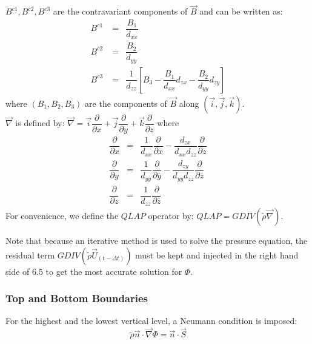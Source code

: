 $B^{c1}, B^{c2}, B^{c3}$ are the contravariant components of
$\overrightarrow{B}$ and can be written as:
\begin{eqnarray}
 B^{c1} \;  &  = &
 \dfrac{{B_1}}{ d_{xx}} \\
 B^{c2} \;  &  = &
 \dfrac{{B_2}}{ d_{yy}} \\
 B^{c3} \;  & = &
\dfrac{1}{d_{zz}}
\left[  B_3 -
   \dfrac  {B_1} {d_{xx}}  d_{zx}
-  \dfrac  {B_2} {d_{yy}}  d_{zy}  \right]
\end{eqnarray}
where $(B_1, B_2, B_3)$ are the components of $\vec{B}$ along
$\left( \vec{i}, \vec{j}, \vec{k} \right)$.\\
$\overrightarrow{\nabla}$ is defined by:
$
\overrightarrow{\nabla}=
\vec{i} \dfrac {\partial{  } } {\partial{x} }  +
\vec{j} \dfrac {\partial{  } } {\partial{y} }  +
\vec{k} \dfrac {\partial{  } } {\partial{z} }
$
where
\begin{eqnarray*}
\dfrac {\partial{  } } {\partial{x} } &=&
\dfrac{1}{d_{xx}}
  \dfrac{\partial  }{\partial \overline{x}}- \dfrac{d_{zx}}{d_{xx}d_{zz}}
\dfrac{\partial  }{\partial \overline{z}}\\
\dfrac {\partial{  } } {\partial{y} } &=&
\dfrac{1}{d_{yy}}
  \dfrac{\partial  }{\partial \overline{y}}- \dfrac{d_{zy}}{d_{yy}d_{zz}}
   \dfrac{\partial  }{\partial \overline{z}}\\
\dfrac {\partial{  } } {\partial{z} } &=&
\dfrac{1}{d_{zz}}
  \dfrac{\partial  }{\partial \overline{z}}
\end{eqnarray*}
For convenience, we define the $QLAP$ operator by: $QLAP =
GDIV(\tilde{\rho} \overrightarrow{\nabla})$.

Note that because an iterative method is used to solve the pressure equation,
the residual term $GDIV(\tilde{\rho} \vec{U}_{(t-\Delta t)})$
must be kept and injected in the right hand side
of 6.5 to get the most accurate solution for $\Phi$.
\subsubsection{Top and Bottom Boundaries}
For the highest and the lowest vertical level, a Neumann condition is
imposed:\\
\begin{equation}
\label{vb1}
\tilde{\rho} \vec{n} \cdot \overrightarrow{\nabla}\Phi= \vec{n} \cdot
\overrightarrow{S}
\end{equation}

